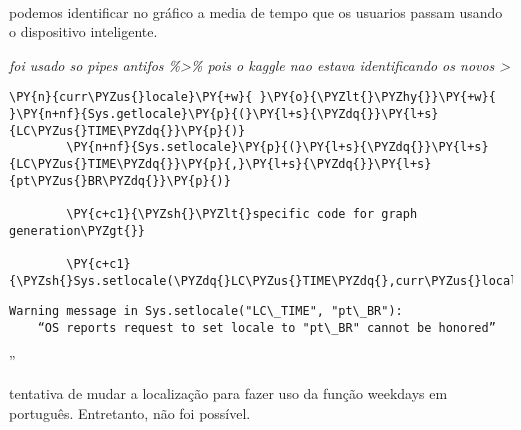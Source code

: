 \begin{center}
\end{center}
{ \hspace*{\fill} \\}

podemos identificar no gráfico a media de tempo que os usuarios passam
usando o dispositivo inteligente.

\emph{foi usado so pipes antifos \%\textgreater\% pois o kaggle nao
    estava identificando os novos \textbar\textgreater{}}


\begin{tcolorbox}[breakable, size=fbox, boxrule=1pt, pad at break*=1mm,colback=cellbackground, colframe=cellborder]
    \begin{Verbatim}[commandchars=\\\{\}]
        \PY{n}{curr\PYZus{}locale}\PY{+w}{ }\PY{o}{\PYZlt{}\PYZhy{}}\PY{+w}{ }\PY{n+nf}{Sys.getlocale}\PY{p}{(}\PY{l+s}{\PYZdq{}}\PY{l+s}{LC\PYZus{}TIME\PYZdq{}}\PY{p}{)}
        \PY{n+nf}{Sys.setlocale}\PY{p}{(}\PY{l+s}{\PYZdq{}}\PY{l+s}{LC\PYZus{}TIME\PYZdq{}}\PY{p}{,}\PY{l+s}{\PYZdq{}}\PY{l+s}{pt\PYZus{}BR\PYZdq{}}\PY{p}{)}

        \PY{c+c1}{\PYZsh{}\PYZlt{}specific code for graph generation\PYZgt{}}

        \PY{c+c1}{\PYZsh{}Sys.setlocale(\PYZdq{}LC\PYZus{}TIME\PYZdq{},curr\PYZus{}locale)}
    \end{Verbatim}
\end{tcolorbox}

\begin{Verbatim}[commandchars=\\\{\}]
    Warning message in Sys.setlocale("LC\_TIME", "pt\_BR"):
    “OS reports request to set locale to "pt\_BR" cannot be honored”
\end{Verbatim}

''


tentativa de mudar a localização para fazer uso da função weekdays em
português. Entretanto, não foi possível.

